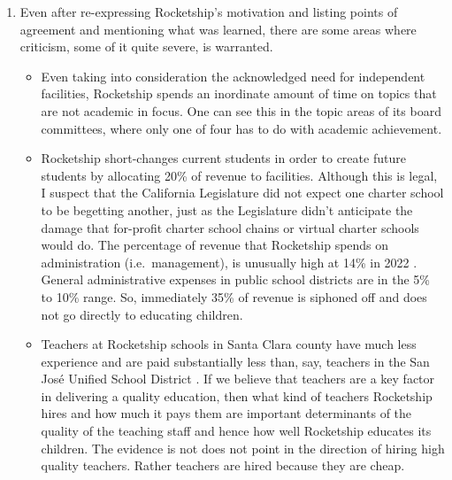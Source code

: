 \begin{enumerate}
  \item Even after re-expressing Rocketship's motivation and listing points of agreement and mentioning what was learned, there are some areas where criticism, some of it quite severe, is warranted.

  \begin{itemize}

    \item Even taking into consideration the acknowledged need for independent facilities, Rocketship spends an inordinate amount of time on topics that are not academic in focus. One can see this in the topic areas of its board committees, where only one of four has to do with academic achievement.
    \item Rocketship short-changes current students in order to create future students by allocating 20\% of revenue to facilities. Although this is legal, I suspect that the California Legislature did not expect one charter school to be begetting another, just as the Legislature didn't anticipate the damage that for-profit charter school chains or virtual charter schools would do.
    The percentage of revenue that Rocketship spends on administration (i.e.\ management), is unusually high at 14\% in 2022 \parencite[38]{RSEA2022}. General administrative expenses in public school districts are in the 5\% to 10\% range. So, immediately 35\% of revenue is siphoned off and does not go directly to educating children.

    \item Teachers at Rocketship schools in Santa Clara county have much less experience and are paid substantially less than, say, teachers in the San José Unified School District \parencite{SCCOE14-23}. If we believe that teachers are a key factor in delivering a quality education, then what kind of teachers Rocketship hires and how much it pays them are important determinants of the quality of the teaching staff and hence how well Rocketship educates its children. The evidence is not does not point in the direction of hiring high quality teachers. Rather teachers are hired because they are cheap.


\end{itemize}
\end{enumerate}
